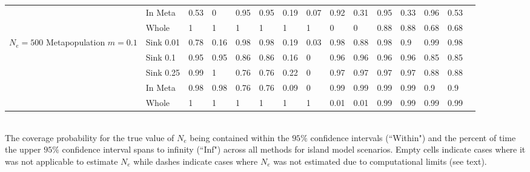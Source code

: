\begin{landscape}
\begin{table}[h]
\begin{tabular}{ | l| l|| l| l| l| l| l| l| l| l| l| l| l| l| l| l| l| l| }
 & In Meta   & 0.53 & 0 & 0.95 & 0.95 & 0.19 & 0.07 & 0.92 & 0.31 & 0.95 & 0.33 & 0.96 & 0.53  &  \multicolumn{4}{l}{} \\ \cline{2-14}
 & Whole  & 1 & 1 & 1 & 1 & 1 & 1 & 0 & 0 & 0.88 & 0.88 & 0.68 & 0.68  &  \multicolumn{4}{l}{} \\ \cline{1-14}
\multirow{5}{1cm}{$N_e = 500$ Metapopulation $m = 0.1$} & Sink 0.01 & 0.78 & 0.16 & 0.98 & 0.98 & 0.19 & 0.03 & 0.98 & 0.88 & 0.98 & 0.9 & 0.99 & 0.98  &  \multicolumn{4}{l}{} \\ \cline{2-14}
 & Sink 0.1   & 0.95 & 0.95 & 0.86 & 0.86 & 0.16 & 0 & 0.96 & 0.96 & 0.96 & 0.96 & 0.85 & 0.85  &  \multicolumn{4}{l}{} \\ \cline{2-14}
 & Sink 0.25   & 0.99 & 1 & 0.76 & 0.76 & 0.22 & 0 & 0.97 & 0.97 & 0.97 & 0.97 & 0.88 & 0.88  &  \multicolumn{4}{l}{} \\ \cline{2-14}
 & In Meta   & 0.98 & 0.98 & 0.76 & 0.76 & 0.09 & 0 & 0.99 & 0.99 & 0.99 & 0.99 & 0.9 & 0.9  &  \multicolumn{4}{l}{} \\ \cline{2-14}
 & Whole  & 1 & 1 & 1 & 1 & 1 & 1 & 0.01 & 0.01 & 0.99 & 0.99 & 0.99 & 0.99  &  \multicolumn{4}{l}{} \\ \cline{1-14}
\end{tabular}
\bigskip{}
{\footnotesize \\ The coverage probability for the true value of $N_e$ being contained within the $95\%$ confidence intervals (``Within") and the percent of time the upper $95\%$ confidence interval spans to infinity (``Inf") across all methods for island model scenarios. Empty cells indicate cases where it was not applicable to estimate $N_e$ while dashes indicate cases where $N_e$ was not estimated due to computational limits (see text).}
\end{table}






\end{landscape}
